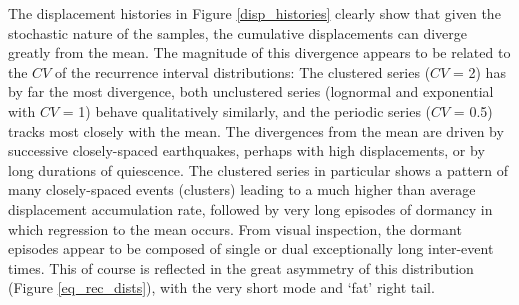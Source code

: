 \documentclass[se, manuscript]{copernicus}
\begin{document}
The displacement histories in Figure \ref{disp_histories} clearly show
that given the stochastic nature of the samples, the cumulative
displacements can diverge greatly from the mean. The magnitude of this
divergence appears to be related to the \(CV\) of the recurrence
interval distributions: The clustered series (\(CV\) = 2) has by far
the most divergence, both unclustered series (lognormal and exponential
with \(CV\) = 1) behave qualitatively similarly, and the periodic
series (\(CV\) = 0.5) tracks most closely with the mean. The
divergences from the mean are driven by successive closely-spaced
earthquakes, perhaps with high displacements, or by long durations of
quiescence. The clustered series in particular shows a pattern of many
closely-spaced events (clusters) leading to a much higher than average
displacement accumulation rate, followed by very long episodes of
dormancy in which regression to the mean occurs. From visual inspection,
the dormant episodes appear to be composed of single or dual
exceptionally long inter-event times. This of course is reflected in the
great asymmetry of this distribution (Figure \ref{eq_rec_dists}), with
the very short mode and `fat' right tail.
\end{document}
